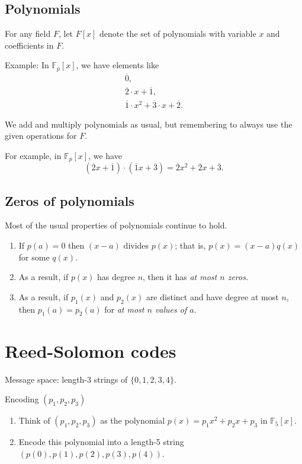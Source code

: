 \documentclass[11pt]{article}
\begin{document}
\subsection*{Polynomials}
\label{sec:org8880eac}
For any field \(F\), let \(F[x]\) denote the set of polynomials with variable \(x\) and coefficients in \(F\).

Example: In \(\mathbb F_p[x]\), we have elements like
\begin{align*}
 \overline 0,\\
 \overline 2 \cdot x + \overline 1, \\
 \overline 1 \cdot x^2 + \overline 3 \cdot x + \overline 2.
\end{align*}

We add and multiply polynomials as usual, but remembering to always use the given operations for \(F\).

For example, in \(\mathbb F_p[x]\), we have
\[
   (\overline 2 x+ \overline 1) \cdot (\overline 1 x+ \overline 3) = \overline 2 x^2 + \overline 2 x + \overline 3.
   \]

\subsection*{Zeros of polynomials}
\label{sec:orgd9570dd}
Most of the usual properties of polynomials continue to hold.

\begin{enumerate}
\item If \(p(a) = 0\) then \((x-a)\) divides \(p(x)\); that is, \(p(x) = (x-a) q(x)\) for some \(q(x)\).
\item As a result, if \(p(x)\) has degree \(n\), then it has \emph{at most \(n\) zeros.}
\item As a result, if \(p_1(x)\) and \(p_2(x)\) are distinct and have degree at most \(n\), then \(p_1(a) = p_2(a)\) for \emph{at most \(n\) values of \(a\)}.
\end{enumerate}

\section*{Reed-Solomon codes}
\label{sec:orge8f2905}
Message space: length-3 strings of \(\{0,1,2,3,4\}\).

Encoding \((p_1, p_2, p_3)\)
\begin{enumerate}
\item Think of \((p_1,p_2,p_3)\) as the polynomial \(p(x) = p_1 x^2 + p_2 x + p_3\) in \(\mathbb F_5[x]\).
\item Encode this polynomial into a length-5 string \((p(0),p(1),p(2),p(3),p(4))\).
\end{enumerate}
\end{document}
